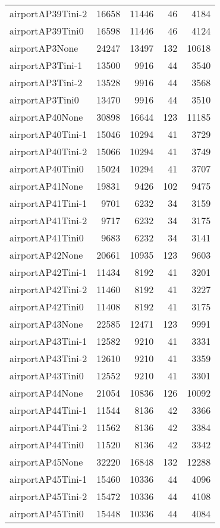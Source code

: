 \begin{longtable}{lrrrr}
airportAP39Tini-2 & 16658 & 11446 & 46 & 4184 \\
airportAP39Tini0 & 16598 & 11446 & 46 & 4124 \\
airportAP3None & 24247 & 13497 & 132 & 10618 \\
airportAP3Tini-1 & 13500 & 9916 & 44 & 3540 \\
airportAP3Tini-2 & 13528 & 9916 & 44 & 3568 \\
airportAP3Tini0 & 13470 & 9916 & 44 & 3510 \\
airportAP40None & 30898 & 16644 & 123 & 11185 \\
airportAP40Tini-1 & 15046 & 10294 & 41 & 3729 \\
airportAP40Tini-2 & 15066 & 10294 & 41 & 3749 \\
airportAP40Tini0 & 15024 & 10294 & 41 & 3707 \\
airportAP41None & 19831 & 9426 & 102 & 9475 \\
airportAP41Tini-1 & 9701 & 6232 & 34 & 3159 \\
airportAP41Tini-2 & 9717 & 6232 & 34 & 3175 \\
airportAP41Tini0 & 9683 & 6232 & 34 & 3141 \\
airportAP42None & 20661 & 10935 & 123 & 9603 \\
airportAP42Tini-1 & 11434 & 8192 & 41 & 3201 \\
airportAP42Tini-2 & 11460 & 8192 & 41 & 3227 \\
airportAP42Tini0 & 11408 & 8192 & 41 & 3175 \\
airportAP43None & 22585 & 12471 & 123 & 9991 \\
airportAP43Tini-1 & 12582 & 9210 & 41 & 3331 \\
airportAP43Tini-2 & 12610 & 9210 & 41 & 3359 \\
airportAP43Tini0 & 12552 & 9210 & 41 & 3301 \\
airportAP44None & 21054 & 10836 & 126 & 10092 \\
airportAP44Tini-1 & 11544 & 8136 & 42 & 3366 \\
airportAP44Tini-2 & 11562 & 8136 & 42 & 3384 \\
airportAP44Tini0 & 11520 & 8136 & 42 & 3342 \\
airportAP45None & 32220 & 16848 & 132 & 12288 \\
airportAP45Tini-1 & 15460 & 10336 & 44 & 4096 \\
airportAP45Tini-2 & 15472 & 10336 & 44 & 4108 \\
airportAP45Tini0 & 15448 & 10336 & 44 & 4084 \\

\end{longtable}
